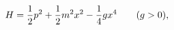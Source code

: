 \begin{equation}
H={1\over2}p^2+{1\over2}m^2x^2-{1\over4}gx^4\qquad(g>0),
\label{e32}
\end{equation}

